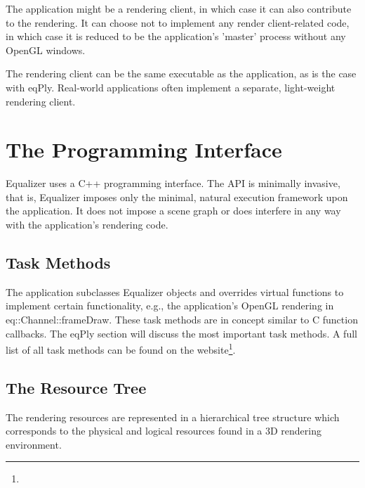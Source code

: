 \documentclass[10pt,a4]{scrartcl}
\begin{document}
The application might be a rendering client, in which case it can also
contribute to the rendering. It can choose not to implement any render
client-related code, in which case it is reduced to be the application's
'master' process without any OpenGL windows.

The rendering client can be the same executable as the application, as
is the case with \textsf{eqPly}. Real-world applications often implement
a separate, light-weight rendering client.

\section{The Programming Interface}

Equalizer uses a C++ programming interface. The API is minimally
invasive, that is, Equalizer imposes only the minimal, natural execution
framework upon the application. It does not impose a scene graph or does
interfere in any way with the application's rendering code.

\subsection{\label{ssTaskMethods}Task Methods}

The application subclasses Equalizer objects and overrides virtual
functions to implement certain functionality, e.g., the application's
OpenGL rendering in \textsf{eq::Chan\-nel::frameDraw}. These task
methods are in concept similar to C function callbacks. The
\textsf{eqPly} section will discuss the most important task methods. A
full list of all task methods can be found on the
website\footnote{}.

\subsection{The Resource Tree}

The rendering resources are represented in a hierarchical tree structure
which corresponds to the physical and logical resources found in a 3D
rendering environment. 
\end{document}
